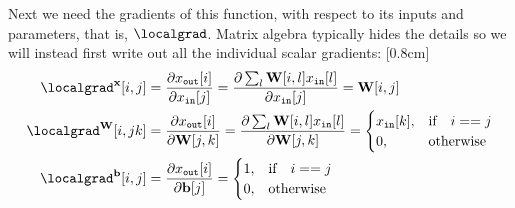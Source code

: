 Next we need the gradients of this function, with respect to its inputs and parameters, that is, $\localgrad$. Matrix algebra typically hides the details so we will instead first write out all the individual scalar gradients:
[0.8cm]
\begin{align}
    \localgrad^{\mathbf{x}}[i,j]  & = \frac{\partial x_{\texttt{out}}[i]}{\partial x_{\texttt{in}}[j]} =
    \frac{\partial \sum_l \mathbf{W}[i,l] x_{\texttt{in}}[l]}{\partial x_{\texttt{in}}[j]} = \mathbf{W}[i,j] \label{lingrad1}                                                               \\
    \localgrad^{\mathbf{W}}[i,jk] & = \frac{\partial x_{\texttt{out}}[i]}{\partial \mathbf{W}[j,k]} = \frac{\partial \sum_l \mathbf{W}[i,l] x_{\texttt{in}}[l]}{\partial \mathbf{W}[j,k]} =
    \begin{cases}
        x_{\texttt{in}}[k], & \text{if} \quad i == j \\
        0,                  & \text{otherwise}
    \end{cases} \label{lingrad2}                                                                                                                                            \\
    \localgrad^{\mathbf{b}}[i,j]  & = \frac{\partial x_{\texttt{out}}[i]}{\partial \mathbf{b}[j]} =
    \begin{cases}
        1, & \text{if} \quad i == j \\
        0, & \text{otherwise}
    \end{cases} \label{lingrad3}
\end{align}

